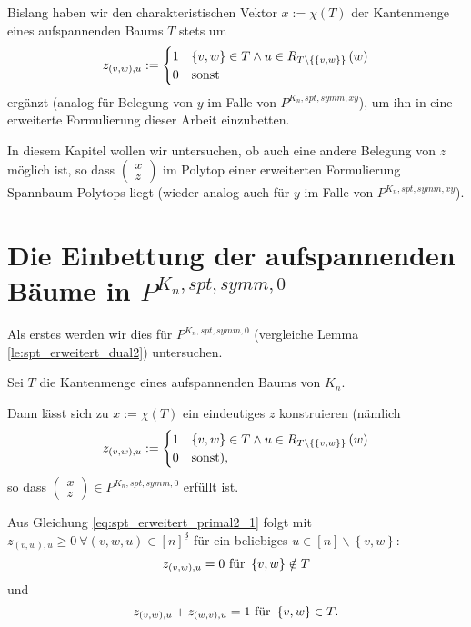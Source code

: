 \documentclass[10p,a4paper,BCOR = 12mm, DIV=15]{scrbook}
\begin{document}
{Bislang haben wir den charakteristischen Vektor $x:=\chi\left(T\right)$ der Kantenmenge eines aufspannenden Baums $T$ stets um
\begin{displaymath}
z_{\left(v, w\right), u} := \begin{cases}
1 & \left\{v, w\right\}\in T\wedge u\in R_{T\backslash \left\{\left\{v, w\right\}\right\}}\left(w\right)\\
0 & \textnormal{sonst}
\end{cases}
\end{displaymath}
ergänzt (analog für Belegung von $y$ im Falle von $P^{K_n, spt, symm, xy}$), um ihn in eine erweiterte Formulierung dieser Arbeit einzubetten.

In diesem Kapitel wollen wir untersuchen, ob auch eine andere Belegung von $z$ möglich ist, so dass $\left(
\begin{array}{c}
x \\
z
\end{array}
\right)$ im Polytop einer erweiterten Formulierung Spannbaum-Polytops liegt (wieder analog auch für $y$ im Falle von $P^{K_n, spt, symm, xy}$).

\section{Die Einbettung der aufspannenden Bäume in $P^{K_n, spt, symm, 0}$}
\label{sec:einb_standard_symm}

Als erstes werden wir dies für $P^{K_n, spt, symm, 0}$ (vergleiche Lemma \ref{le:spt_erweitert_dual2}) untersuchen.

\begin{Sa}
\label{sa:einbettung_normale_erweiterung}
Sei $T$ die Kantenmenge eines aufspannenden Baums von $K_n$.

Dann lässt sich zu $x:=\chi\left(T\right)$ ein eindeutiges $z$ konstruieren (nämlich 
\begin{equation}
z_{\left(v, w\right), u} := \begin{cases}
1 & \left\{v, w\right\}\in T\wedge u\in R_{T\backslash \left\{\left\{v, w\right\}\right\}}\left(w\right)\\
0 & \textnormal{sonst),}
\end{cases} \label{eq:z_belegung}
\end{equation}
so dass $
\left(
\begin{array}{c}
x \\
z
\end{array}
\right)
\in P^{K_n, spt, symm, 0}$ erfüllt ist.
\end{Sa}
\begin{bew}
Aus Gleichung \eqref{eq:spt_erweitert_primal2_1} folgt mit $z_{\left(v, w\right), u} \geq 0 \ \forall \left(v, w, u\right) \in \left[n\right]^{\underline{3}}$ für ein beliebiges $u \in \left[n\right] \backslash \left\{v, w\right\}$:
\begin{displaymath}
z_{\left(v, w\right), u} = 0 \textnormal{ für } \left\{v, w\right\}\notin T
\end{displaymath}
und 
\begin{displaymath}
z_{\left(v, w\right), u}+z_{\left(w, v\right), u} = 1 \textnormal{ für } \left\{v, w\right\}\in T.
\end{displaymath}


\end{bew}}
\end{document}
